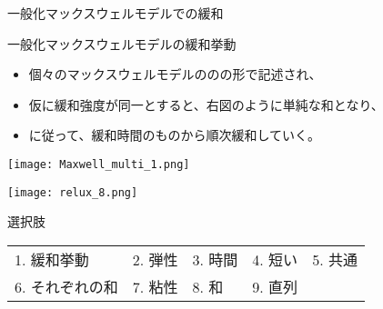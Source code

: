 \documentclass[uplatex,dvipdfmx,a4paper,11pt]{jsreport}
\begin{document}
\begin{qlist}
\begin{qlist2}
			\vspace{5mm}
			\qitem 一般化マックスウェルモデルでの緩和
			\begin{center}
				\begin{minipage}{0.86\textwidth}
					\begin{itembox}[l]{一般化マックスウェルモデルの緩和挙動}
						\begin{itemize}
							\item 個々のマックスウェルモデルの\qbox{}の\qbox{}の形で記述され、
							\item 仮に緩和強度が同一とすると、右図のように単純な和となり、
							\item \qbox{}に従って、緩和時間の\qbox{}ものから順次緩和していく。
						\end{itemize}
					\end{itembox}
				\end{minipage}
				\begin{minipage}{0.43\textwidth}
					\begin{center}
						\texttt{[image: Maxwell\_multi\_1.png]}
					\end{center}
				\end{minipage}
				\begin{minipage}{0.43\textwidth}
					\begin{center}
						\texttt{[image: relux\_8.png]}
					\end{center}
				\end{minipage}
			\end{center}
				
		\end{qlist2}

		\begin{itembox}[l]{選択肢}
			\begin{center}
				\begin{tabular}{lllll}
					1. 緩和挙動	&2. 弾性	&3. 時間	&4. 短い	&5. 共通\\
					6. それぞれの和	&7. 粘性		&8. 和	&9. 直列
				\end{tabular}
			\end{center}
		\end{itembox}
\end{qlist}
\end{document}
